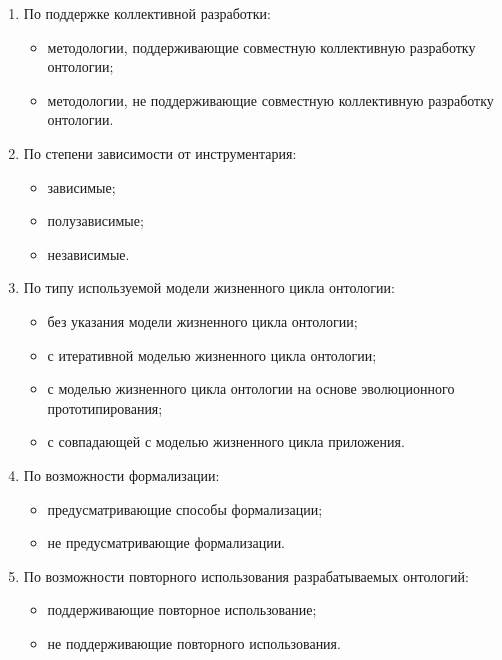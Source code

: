 \begin{enumerate}
  \item {По поддержке коллективной разработки:
    \begin{itemize}
        \item методологии, поддерживающие совместную коллективную разработку онтологии; 
        \item методологии, не поддерживающие совместную коллективную разработку онтологии. 
    \end{itemize}
  }
  
  \item {По степени зависимости от инструментария: 
    \begin{itemize}
        \item зависимые;
        \item полузависимые;
        \item независимые.
    \end{itemize}
  }
  
  \item {По типу используемой модели жизненного цикла онтологии:
    \begin{itemize}
        \item без указания модели жизненного цикла онтологии;
        \item с итеративной моделью жизненного цикла онтологии;
        \item с моделью жизненного цикла онтологии на основе эволюционного прототипирования;
        \item с совпадающей с моделью жизненного цикла приложения.
    \end{itemize}
  }
  
  \item {По возможности формализации:
    \begin{itemize}
        \item предусматривающие способы формализации;
        \item не предусматривающие формализации. 
    \end{itemize}
  }
  
  \item {По возможности повторного использования разрабатываемых онтологий:
    \begin{itemize}
        \item поддерживающие повторное использование;
        \item не поддерживающие повторного использования.
    \end{itemize}
  }
  

\end{enumerate}
